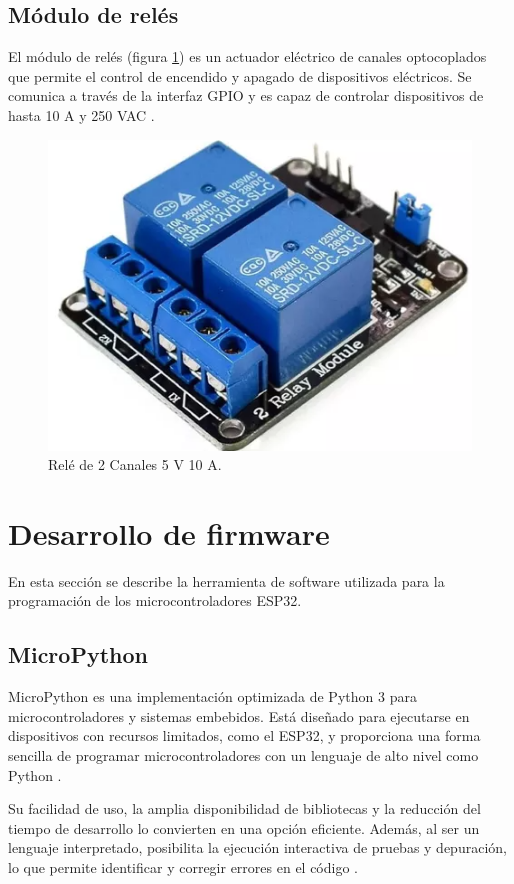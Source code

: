 \subsection{Módulo de relés}

El módulo de relés (figura \ref{fig:Relé}) es un actuador eléctrico de canales
optocoplados que permite el control de encendido y apagado de dispositivos
eléctricos. Se comunica a través de la interfaz GPIO y es capaz de controlar
dispositivos de hasta 10 A y 250 VAC \cite{Relé}.

\begin{figure}[H]
	\centering
	\includegraphics[height=.15\textwidth]{./Images/13.png}
	\caption{Relé de 2 Canales 5 V 10 A\protect\footnotemark.}
	\label{fig:Relé}
\end{figure}



\section{Desarrollo de firmware}

En esta sección se describe la herramienta de software utilizada para la
programación de los microcontroladores ESP32.

\subsection{MicroPython}

MicroPython es una implementación optimizada de Python 3 para
microcontroladores y sistemas embebidos. Está diseñado para ejecutarse en
dispositivos con recursos limitados, como el ESP32, y proporciona una forma
sencilla de programar microcontroladores con un lenguaje de alto nivel como
Python \cite{MicroPython}.

Su facilidad de uso, la amplia disponibilidad de bibliotecas y la reducción del
tiempo de desarrollo lo convierten en una opción eficiente. Además, al ser un
lenguaje interpretado, posibilita la ejecución interactiva de pruebas y
depuración, lo que permite identificar y corregir errores en el código
\cite{CTAMicroPython}.

